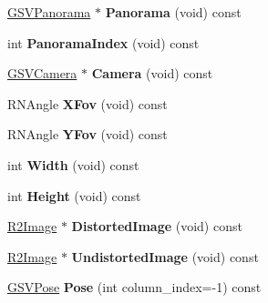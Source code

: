 \begin{DoxyCompactItemize}
\item 
\hyperlink{class_g_s_v_panorama}{G\+S\+V\+Panorama} $\ast$ {\bfseries Panorama} (void) const \hypertarget{class_g_s_v_image_a2d5a6bacfee7b7985ff7f77ba233177a}{}\label{class_g_s_v_image_a2d5a6bacfee7b7985ff7f77ba233177a}

\item 
int {\bfseries Panorama\+Index} (void) const \hypertarget{class_g_s_v_image_ab84466f094400e7373c39575e89e8d7a}{}\label{class_g_s_v_image_ab84466f094400e7373c39575e89e8d7a}

\item 
\hyperlink{class_g_s_v_camera}{G\+S\+V\+Camera} $\ast$ {\bfseries Camera} (void) const \hypertarget{class_g_s_v_image_ab6694c39dbb2102f2c383135244ba531}{}\label{class_g_s_v_image_ab6694c39dbb2102f2c383135244ba531}

\item 
R\+N\+Angle {\bfseries X\+Fov} (void) const \hypertarget{class_g_s_v_image_af1784344ba4a8c99fae4e9f2d3d1d149}{}\label{class_g_s_v_image_af1784344ba4a8c99fae4e9f2d3d1d149}

\item 
R\+N\+Angle {\bfseries Y\+Fov} (void) const \hypertarget{class_g_s_v_image_afce39acd0ded416222357bb2d3211d85}{}\label{class_g_s_v_image_afce39acd0ded416222357bb2d3211d85}

\item 
int {\bfseries Width} (void) const \hypertarget{class_g_s_v_image_ae6d4f6b89abb8ba6518f1e0b1816f739}{}\label{class_g_s_v_image_ae6d4f6b89abb8ba6518f1e0b1816f739}

\item 
int {\bfseries Height} (void) const \hypertarget{class_g_s_v_image_ab58010e01c21840ea6034a3edf814450}{}\label{class_g_s_v_image_ab58010e01c21840ea6034a3edf814450}

\item 
\hyperlink{class_r2_image}{R2\+Image} $\ast$ {\bfseries Distorted\+Image} (void) const \hypertarget{class_g_s_v_image_a29ad8003e8c2c17027b86bf5a05eb435}{}\label{class_g_s_v_image_a29ad8003e8c2c17027b86bf5a05eb435}

\item 
\hyperlink{class_r2_image}{R2\+Image} $\ast$ {\bfseries Undistorted\+Image} (void) const \hypertarget{class_g_s_v_image_a1afe62ad1a12cb7c5930f39a25a8ed34}{}\label{class_g_s_v_image_a1afe62ad1a12cb7c5930f39a25a8ed34}

\item 
\hyperlink{class_g_s_v_pose}{G\+S\+V\+Pose} {\bfseries Pose} (int column\+\_\+index=-\/1) const \hypertarget{class_g_s_v_image_a2af4f37765ab575f5e07b4688e6f3ecb}{}\label{class_g_s_v_image_a2af4f37765ab575f5e07b4688e6f3ecb}


\end{DoxyCompactItemize}
